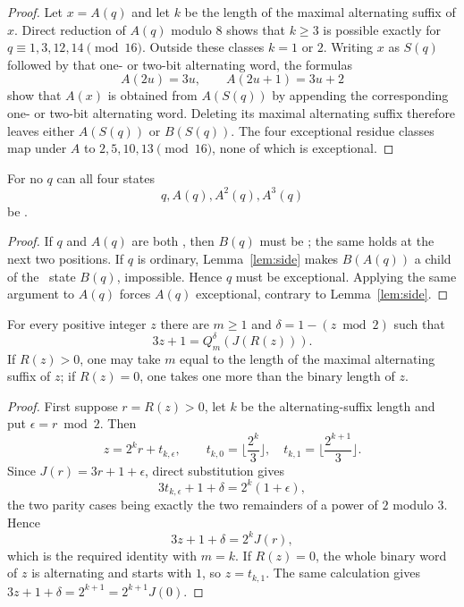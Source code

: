 \begin{proof}
Let $x=A(q)$ and let $k$ be the length of the maximal alternating suffix of
$x$. Direct reduction of $A(q)$ modulo $8$ shows that $k\ge3$ is possible
exactly for $q\equiv1,3,12,14\pmod{16}$. Outside these classes $k=1$ or
$2$. Writing $x$ as $S(q)$ followed by that one- or two-bit alternating word,
the formulas
\[
  A(2u)=3u,\qquad A(2u+1)=3u+2
\]
show that $A(x)$ is obtained from $A(S(q))$ by appending the corresponding
one- or two-bit alternating word. Deleting its maximal alternating suffix
therefore leaves either $A(S(q))$ or $B(S(q))$. The four exceptional residue
classes map under $A$ to $2,5,10,13\pmod{16}$, none of which is exceptional.
\end{proof}

\begin{corollary}\label{cor:no-four-win}
For no $q$ can all four states
\[
  q,A(q),A^2(q),A^3(q)
\]
be \WIN.
\end{corollary}

\begin{proof}
If $q$ and $A(q)$ are both \WIN, then $B(q)$ must be \LOSS; the same holds at
the next two positions. If $q$ is ordinary, Lemma~\ref{lem:side} makes
$B(A(q))$ a child of the \LOSS\ state $B(q)$, impossible. Hence $q$ must be
exceptional. Applying the same argument to $A(q)$ forces $A(q)$ exceptional,
contrary to Lemma~\ref{lem:side}.
\end{proof}

\begin{lemma}\label{lem:alt-lift}
For every positive integer $z$ there are $m\ge1$ and
$\delta=1-(z\bmod2)$ such that
\[
  3z+1=Q_m^\delta(J(R(z))).
\]
If $R(z)>0$, one may take $m$ equal to the length of the maximal alternating
suffix of $z$; if $R(z)=0$, one takes one more than the binary length of $z$.
\end{lemma}

\begin{proof}
First suppose $r=R(z)>0$, let $k$ be the alternating-suffix length and put
$\epsilon=r\bmod2$. Then
\[
 z=2^k r+t_{k,\epsilon},\qquad
 t_{k,0}=\Big\lfloor\frac{2^k}{3}\Big\rfloor,
 \quad t_{k,1}=\Big\lfloor\frac{2^{k+1}}{3}\Big\rfloor.
\]
Since $J(r)=3r+1+\epsilon$, direct substitution gives
\[
 3t_{k,\epsilon}+1+\delta=2^k(1+\epsilon),
\]
the two parity cases being exactly the two remainders of a power of $2$
modulo $3$. Hence
\[
 3z+1+\delta=2^kJ(r),
\]
which is the required identity with $m=k$. If $R(z)=0$, the whole binary word
of $z$ is alternating and starts with $1$, so
$z=t_{k,1}$. The same calculation gives
$3z+1+\delta=2^{k+1}=2^{k+1}J(0)$.
\end{proof}

